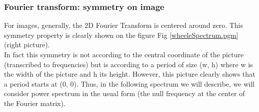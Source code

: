 \documentclass[a4paper]{article}
\begin{document}
    	\subsubsection{Fourier transform: symmetry on image}
        For images, generally, the 2D Fourier Transform is centered around zero.   This symmetry property is clearly shown on the figure Fig \ref{wheeleSpectrum.pgm} (right picture).\\
         In fact this symmetry is not according to the central coordinate of the picture (transcribed to frequencies) but is according to a period of size (w, h) where w is the width of the picture and h its height.   However, this picture clearly shows that a period starts at (0, 0).   Thus, in the following spectrum we will describe, we will consider power spectrum in the usual form (the null frequency at the center of the Fourier matrix).\\
\end{document}
